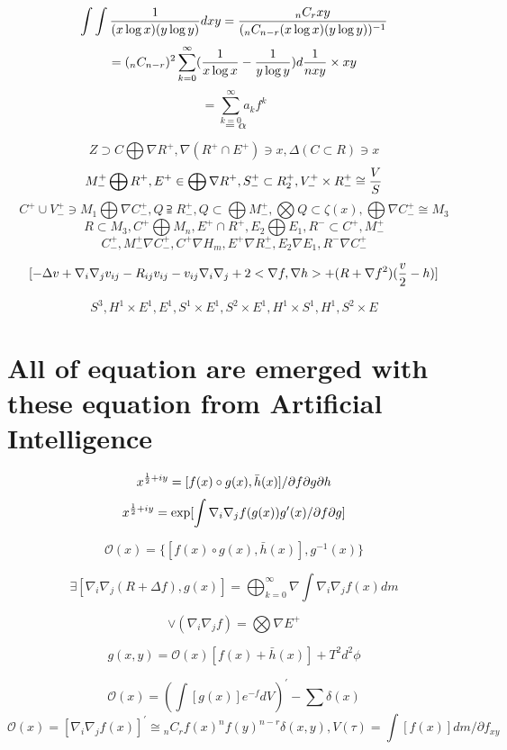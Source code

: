 \documentclass{jsarticle}
\begin{document}
   $$ {\int \int {1 \over (x \log x)(y \log y)}dxy} = {{{}_nC_{r} xy} \over {({}_nC_{n-r} 
   (x \log x)(y \log y))^{-1}}} $$
   $$ = ({}_nC_{n-r})^2 \sum_{k= 0}^{\infty}({1 \over x \log x} - {1 \over y \log y})d{1 \over nxy} \times {xy} $$
   $$ = \sum_{k=0}^{\infty} a_k f^k $$
   $$ = \alpha $$

   $$ Z \supset C \bigoplus \nabla R^{+}, \nabla(R^{+} \cap E^{+}) \ni x, \Delta(C \subset R) \ni x $$
   $$ M^{+}_{-}\bigoplus R^{+}, E^{+} \in \bigoplus \nabla R^{+}, S^{+}_{-} \subset R^{+}_{2}, V^{+}_{-} \times R^{+}_{-} \cong {V \over S} $$
   $$ C^{+} \cup V^{+}_{-} \ni M_{1}\bigoplus \nabla C^{+}_{-}, Q \supseteqq R^{+}_{-}, Q \subset \bigoplus M^{+}_{-}, 
   \bigotimes Q \subset \zeta(x), \bigoplus \nabla C^{+}_{-} \cong M_3 $$
   $$R \subset M_3,
   C^{+} \bigoplus M_n, E^{+} \cap R^{+},
   E_2 \bigoplus E_1, R^{-} \subset C^{+}, M^{+}_{-} $$
  $$ C^{+}_{-}, M^{+}_{-}\nabla C^{+}_{-}, C^{+}\nabla H_m,
  E^{+} \nabla R^{+}_{-}, E_2 \nabla E_1, 
   R^{-} \nabla C^{+}_{-} $$

   $$ [- \Delta v + \nabla_{i} \nabla_{j} v_{ij} - R_{ij} v_{ij} 
  - v_{ij} \nabla_{i} \nabla_{j} + 2 < \nabla f, \nabla h> + (R + \nabla f^2)({v \over 2} - h)]  $$

  $$  S^3, H^1 \times E^1, E^1, S^1 \times E^1, S^2 \times E^1, H^1 \times S^1, H^1, S^2 \times E $$

\section{All of equation are emerged with \\ 
these equation from  Artificial Intelligence}
$$ x^{{1 \over 2} + iy} = [f(x) \circ g(x), \bar{h}(x)]/ \partial f\partial g\partial h $$
$$ x^{{1 \over 2} + iy} = \mathrm{exp}[\int \nabla_{i}\nabla_{j}f(g(x))g'(x)/ \partial f\partial g] $$

$$ \mathcal{O}(x) = \{[f(x)\circ g(x) , \bar{h}(x)], g^{-1}(x)\} $$

$$   \exists [\nabla_{i} \nabla_{j} (R + \Delta f), g(x)] = \bigoplus_{k=0}^{\infty}
\nabla \int \nabla_{i} \nabla_{j}f(x)dm $$

  $$ \vee (\nabla_{i} \nabla_{j} f) = \bigotimes \nabla E^{+} $$

  $$  g(x,y) = \mathcal{O}(x)[f(x) + \bar{h}(x)] + T^2 d^2 \phi $$

 $$  \mathcal{O}(x) = \left( \int [g(x)] e^{-f}dV \right)^{'} - \sum \delta (x) $$
 $$  \mathcal{O}(x) = [\nabla_{i}\nabla_{j}f(x)]^{'} \cong {}_{n}C_{r} f(x)^{n} f(y)^{n-r} \delta (x,y), 
   V(\tau) = \int [f(x)]dm/ \partial f_{xy} $$
\end{document}
